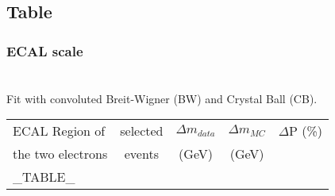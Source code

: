 \subsection{Table}
\color{titlecolor}
\usebackgroundtemplate{
	\texttt{[image: ]}%
}
\begin{frame}
  \frametitle{ECAL scale}
  \framesubtitle{\invMassVarName }
\\
  Fit with convoluted Breit-Wigner (BW) and Crystal Ball (CB).


  
  \begin{center}
    \emph{\dataSample}\xspace \invMassVarName

    \begin{tabular}{|l|c|*{3}{c|}} \hline
      ECAL Region of & selected  & $\Delta m_{data}$ & $\Delta m_{MC}$  & $\Delta$P (\%) \\
      the two electrons & events & (GeV) & (GeV) & \\
      \hline
      \hline
      _TABLE_
      \hline		
    \end{tabular}
  \end{center}


\end{frame}


